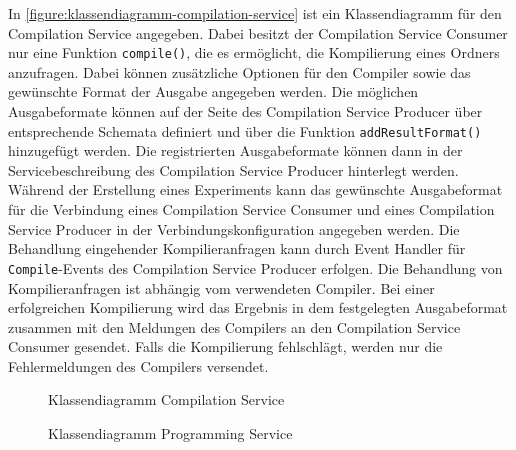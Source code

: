 In \autoref{figure:klassendiagramm-compilation-service} ist ein Klassendiagramm für den Compilation Service angegeben. Dabei besitzt der Compilation Service Consumer nur eine Funktion \texttt{compile()}, die es ermöglicht, die Kompilierung eines Ordners anzufragen. Dabei können zusätzliche Optionen für den Compiler sowie das gewünschte Format der Ausgabe angegeben werden. Die möglichen Ausgabeformate können auf der Seite des Compilation Service Producer über entsprechende Schemata definiert und über die Funktion \texttt{addResultFormat()} hinzugefügt werden. Die registrierten Ausgabeformate können dann in der Servicebeschreibung des Compilation Service Producer hinterlegt werden. Während der Erstellung eines Experiments kann das gewünschte Ausgabeformat für die Verbindung eines Compilation Service Consumer und eines Compilation Service Producer in der Verbindungskonfiguration angegeben werden. Die Behandlung eingehender Kompilieranfragen kann durch Event Handler für \texttt{Compile}-Events des Compilation Service Producer erfolgen. Die Behandlung von Kompilieranfragen ist abhängig vom verwendeten Compiler. Bei einer erfolgreichen Kompilierung wird das Ergebnis in dem festgelegten Ausgabeformat zusammen mit den Meldungen des Compilers an den Compilation Service Consumer gesendet. Falls die Kompilierung fehlschlägt, werden nur die Fehlermeldungen des Compilers versendet.

\begin{figure}[tbp]
    \centering
    \caption{Klassendiagramm Compilation Service}
    \label{figure:klassendiagramm-compilation-service}
\end{figure}

\begin{figure}[tbp]
    \centering
    \caption{Klassendiagramm Programming Service}
    \label{figure:klassendiagramm-programming-service}
\end{figure}


